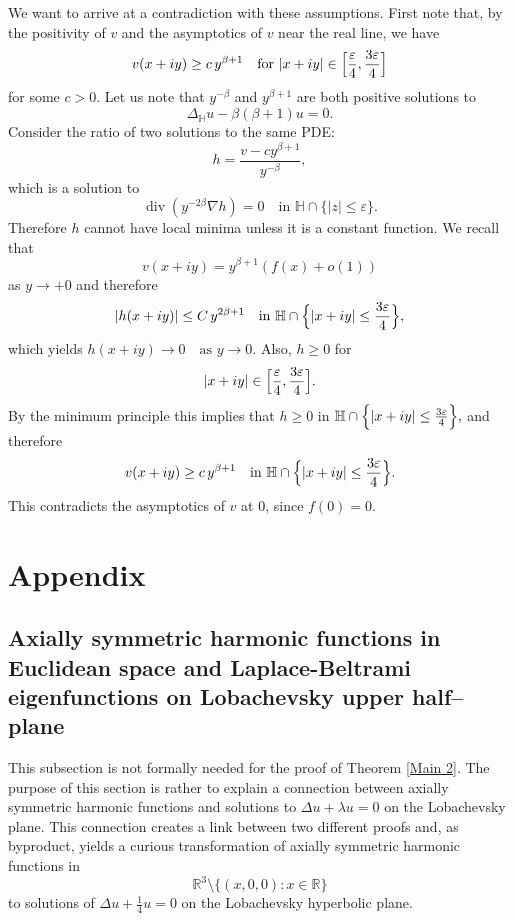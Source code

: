 \documentclass{article}
\begin{document}
We want to arrive at a contradiction with these assumptions. First note that, by the positivity of $v$ and the asymptotics of $v$ near the real line, we have
\[
v(x+iy) \ge c\, y^{\beta+1} \quad \text{for } |x+iy| \in \Bigl[\frac{\varepsilon}{4},\frac{3\varepsilon}{4}\Bigr]
\]
for some $c>0$. Let us note that $y^{-\beta}$ and $y^{\beta+1}$ are both positive solutions to
\[
\Delta_{\mathbb{H}} u - \beta(\beta+1)u = 0.
\]
Consider the ratio of two solutions to the same PDE:
\[
h = \frac{v - c y^{\beta+1}}{y^{-\beta}},
\]
which is a solution to
\[
\operatorname{div}(y^{-2\beta} \nabla h)=0
\quad \text{in } \mathbb{H}\cap\{|z|\le \varepsilon\}.
\]
Therefore $h$ cannot have local minima unless it is a constant function.  We recall that 
$$ v(x+iy)= y^{\beta+1}(f(x)+o(1))$$
as $y\to+0$ and therefore
\[
|h(x+iy)| \le C\, y^{2\beta+1}
\quad \text{in } \mathbb{H}\cap\Bigl\{|x+iy|\le \frac{3\varepsilon}{4}\Bigr\},
\]
which yields $h(x+iy) \to 0 \quad \text{as } y\to 0.$
Also, $h \geq 0$ for 
\[
|x+iy|\in \Bigl[\frac{\varepsilon}{4},\frac{3\varepsilon}{4}\Bigr].
\]
By the minimum principle this implies that $h\ge 0$ in
\(
\mathbb{H}\cap\Bigl\{|x+iy|\le \frac{3\varepsilon}{4}\Bigr\},
\)
and therefore
\[
v(x+iy) \ge c\, y^{\beta+1}
\quad \text{in } \mathbb{H}\cap\Bigl\{|x+iy|\le \frac{3\varepsilon}{4}\Bigr\}.
\]
This contradicts the asymptotics of $v$ at $0$, since $f(0)=0$.








\section{Appendix}




\subsection*{Axially symmetric harmonic functions in Euclidean space and Laplace-Beltrami eigenfunctions on Lobachevsky upper half--plane}

This subsection is not formally needed for the proof of Theorem \ref{Main 2}. 
The purpose of this section is rather
to explain a connection between axially symmetric harmonic functions and  solutions to
\(\Delta u + \lambda u =0 \) on the Lobachevsky plane. This connection creates a link between two different proofs and, as byproduct, yields a curious transformation of axially symmetric harmonic functions in
\[
\mathbb{R}^3 \setminus \{(x,0,0) : x \in \mathbb{R}\}
\]
to solutions of \(\Delta u + \frac{1}{4}u = 0\) on the Lobachevsky hyperbolic plane.
\end{document}
